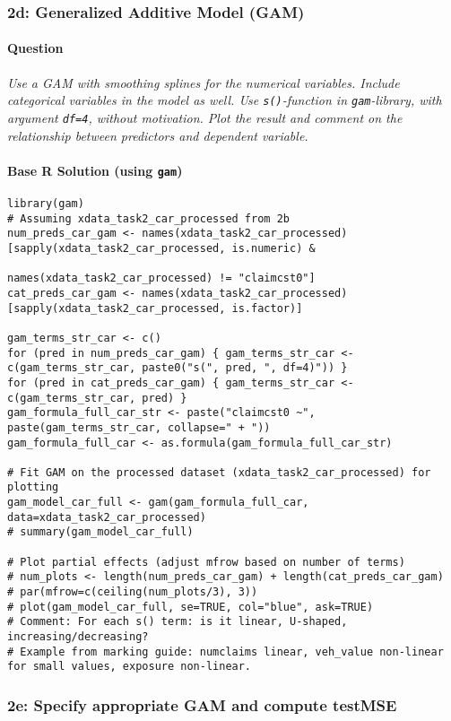 \documentclass[12pt,a4paper]{article}
\newcommand{\Rpackage}[1]{\texttt{#1}} %
\newcommand{\Rfunction}[1]{\texttt{#1()}} %
\newcommand{\Rcode}[1]{\texttt{#1}} %
\begin{document}
    \subsubsection{2d: Generalized Additive Model (GAM)}
        \paragraph{Question}
        \textit{Use a GAM with smoothing splines for the numerical variables. Include categorical variables in the model as well. Use \Rfunction{s}-function in \Rpackage{gam}-library, with argument \Rcode{df=4}, without motivation. Plot the result and comment on the relationship between predictors and dependent variable.}
        \paragraph{Base R Solution (using \Rpackage{gam})}
\begin{lstlisting}[]
library(gam)
# Assuming xdata_task2_car_processed from 2b
num_preds_car_gam <- names(xdata_task2_car_processed)[sapply(xdata_task2_car_processed, is.numeric) & 
                                              names(xdata_task2_car_processed) != "claimcst0"]
cat_preds_car_gam <- names(xdata_task2_car_processed)[sapply(xdata_task2_car_processed, is.factor)]

gam_terms_str_car <- c()
for (pred in num_preds_car_gam) { gam_terms_str_car <- c(gam_terms_str_car, paste0("s(", pred, ", df=4)")) }
for (pred in cat_preds_car_gam) { gam_terms_str_car <- c(gam_terms_str_car, pred) }
gam_formula_full_car_str <- paste("claimcst0 ~", paste(gam_terms_str_car, collapse=" + "))
gam_formula_full_car <- as.formula(gam_formula_full_car_str)

# Fit GAM on the processed dataset (xdata_task2_car_processed) for plotting
gam_model_car_full <- gam(gam_formula_full_car, data=xdata_task2_car_processed)
# summary(gam_model_car_full)

# Plot partial effects (adjust mfrow based on number of terms)
# num_plots <- length(num_preds_car_gam) + length(cat_preds_car_gam)
# par(mfrow=c(ceiling(num_plots/3), 3)) 
# plot(gam_model_car_full, se=TRUE, col="blue", ask=TRUE) 
# Comment: For each s() term: is it linear, U-shaped, increasing/decreasing?
# Example from marking guide: numclaims linear, veh_value non-linear for small values, exposure non-linear.
\end{lstlisting}

    \subsubsection{2e: Specify appropriate GAM and compute testMSE}
\end{document}
